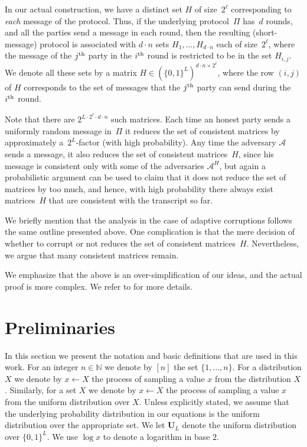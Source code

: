 \documentclass[11pt]{article}
\theoremstyle{plain}
\theoremstyle{definition}
\numberwithin{equation}{section}
\numberwithin{equation}{section} \newcommand{\aka} {also known as\ }
\newcommand{\U}{\mathbf U}
\newcommand{\B}{\{ 0,1 \}}
\newcommand{\1}{\mathbf{1}}
\newcommand{\Adv}{\mathcal A}
\newcommand{\ith}[1]{{#1}\textsuperscript{th}}
\theoremstyle{remark}
\begin{document}
In our actual construction, we have a distinct set $H$ of size~$2^\ell$
corresponding to {\em each} message of the protocol.  Thus, if the underlying
protocol~$\Pi$ has~$d$ rounds, and all the parties send a message in each round,
then the resulting (short-message) protocol is associated with $d\cdot n$ sets
$H_1,\ldots,H_{d\cdot n}$ each of size~$2^\ell$, where the message of the
$\ith{j}$ party in the $\ith{i}$ round is restricted to be in the set $H_{i,j}$.
We denote all these sets by a matrix $H\in\left(\{0,1\}^L\right)^{{d\cdot
    n}\times 2^\ell}$, where the row $(i,j)$ of $H$ corresponds to the set of
messages that the $\ith{j}$ party can send during the $\ith{i}$ round.

Note that there are $2^{L\cdot 2^\ell\cdot d\cdot n}$ such matrices.  Each time
an honest party sends a uniformly random message in~$\Pi$ it reduces the set of
consistent matrices by approximately a~$2^L$-factor (with high probability).
Any time the adversary $\Adv$ sends a message, it also reduces the set of
consistent matrices~$H$, since his message is consistent only with some of the
adversaries $\Adv^H$, but again a probabilistic argument can be used to claim
that it does not reduce the set of matrices by too much, and hence, with high
probability there always exist matrices~$H$ that are consistent with the
transcript so far.

We briefly mention that the analysis in the case of adaptive corruptions follows
the same outline presented above.  One complication is that the mere decision of
whether to corrupt or not reduces the set of consistent matrices~$H$. Nevertheless, we
argue that many consistent matrices remain.

We emphasize that the above is an over-simplification of our ideas, and the actual proof is more complex.
We refer to  for more details.

\section{Preliminaries}\label{sec:prelim}
In this section we present the notation and basic definitions that are used in
this work. For an integer $n \in \mathbb{N}$ we denote by $[n]$ the set
$\{1,\ldots, n\}$.  For a distribution $X$ we denote by $x \leftarrow X$ the
process of sampling a value $x$ from the distribution $X$. Similarly, for a set
$X$ we denote by $x \leftarrow X$ the process of sampling a
value $x$ from the uniform distribution over $X$.  Unless explicitly
stated, we assume that the underlying probability distribution in our equations
is the uniform distribution over the appropriate set. We let $\U_L$ denote the
uniform distribution over $\B^L$. We use $\log x$ to denote a logarithm in
base $2$.
\end{document}
